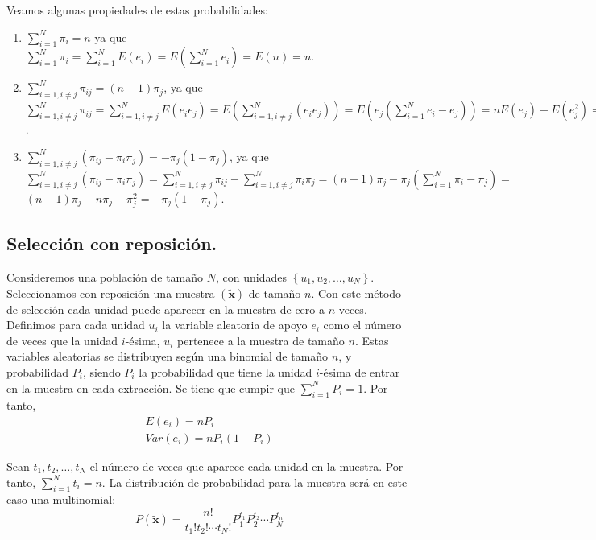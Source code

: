 Veamos algunas propiedades de estas probabilidades:
\begin{enumerate}
\item $\sum_{i=1}^{N}\pi_{i}=n$ ya que $\sum_{i=1}^{N}\pi_{i}=\sum_{i=1}^{N}E\left(e_{i}\right)=E\left(\sum_{i=1}^{N}e_{i}\right)=E\left(n\right)=n$.
\item $\sum_{i=1,i\neq j}^{N}\pi_{ij}=\left(n-1\right)\pi_{j}$, ya que
$\sum_{i=1,i\neq j}^{N}\pi_{ij}=\sum_{i=1,i\neq j}^{N}E\left(e_{i}e_{j}\right)=E\left(\sum_{i=1,i\neq j}^{N}\left(e_{i}e_{j}\right)\right)=E\left(e_{j}\left(\sum_{i=1}^{N}e_{i}-e_{j}\right)\right)=nE\left(e_{j}\right)-E\left(e_{j}^{2}\right)=\left(n-1\right)\pi_{j}$.
\item $\sum_{i=1,i\neq j}^{N}\left(\pi_{ij}-\pi_{i}\pi_{j}\right)=-\pi_{j}\left(1-\pi_{j}\right)$,
ya que $\sum_{i=1,i\neq j}^{N}\left(\pi_{ij}-\pi_{i}\pi_{j}\right)=\sum_{i=1,i\neq j}^{N}\pi_{ij}-\sum_{i=1,i\neq j}^{N}\pi_{i}\pi_{j}=\left(n-1\right)\pi_{j}-\pi_{j}\left(\sum_{i=1}^{N}\pi_{i}-\pi_{j}\right)=$
$\left(n-1\right)\pi_{j}-n\pi_{j}-\pi_{j}^{2}=-\pi_{j}\left(1-\pi_{j}\right)$.
\end{enumerate}

\subsection{Selecci\'on con reposici\'on.}

Consideremos una poblaci\'on de tama\~no $N$, con unidades $\left\{ u_{1},u_{2},\ldots,u_{N}\right\} $.
Seleccionamos con reposici\'on una muestra $\left(\tilde{\boldsymbol{x}}\right)$
de tama\~no $n$. Con este m\'etodo de selecci\'on cada unidad puede aparecer
en la muestra de cero a $n$ veces. Definimos para cada unidad $u_{i}$
la variable aleatoria de apoyo $e_{i}$ como el n\'umero de veces que
la unidad $i$-\'esima, $u_{i}$ pertenece a la muestra de tama\~no $n$.
Estas variables aleatorias se distribuyen seg\'un una binomial de tama\~no
$n$, y probabilidad $P_{i}$, siendo $P_{i}$ la probabilidad que
tiene la unidad $i$-\'esima de entrar en la muestra en cada extracci\'on.
Se tiene que cumpir que $\sum_{i=1}^{N}P_{i}=1$. Por tanto, 
\[
\begin{array}{c}
E\left(e_{i}\right)=nP_{i}\\
Var\left(e_{i}\right)=nP_{i}\left(1-P_{i}\right)
\end{array}
\]


Sean $t_{1},t_{2},\ldots,t_{N}$ el n\'umero de veces que aparece cada
unidad en la muestra. Por tanto, $\sum_{i=1}^{N}t_{i}=n$. La distribuci\'on
de probabilidad para la muestra ser\'a en este caso una multinomial:
\[
P\left(\tilde{\boldsymbol{x}}\right)=\dfrac{n!}{t_{1}!t_{2}!\cdots t_{N}!}P_{1}^{t_{1}}P_{2}^{t_{2}}\cdots P_{N}^{t_{n}}
\]


